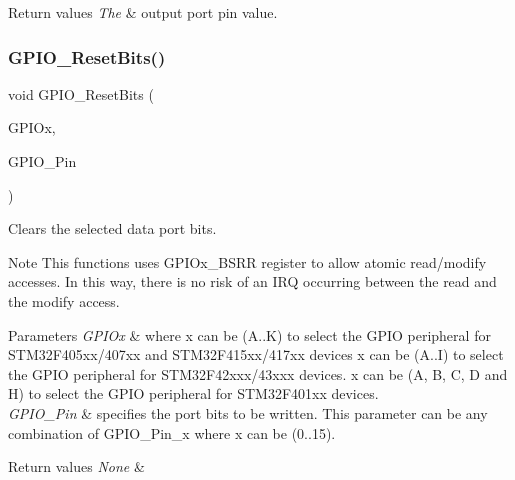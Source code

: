 \begin{DoxyRetVals}{Return values}
{\em The} & output port pin value. \\
\hline
\end{DoxyRetVals}
\mbox{\label{group___g_p_i_o_ga6fcd35b207a66608dd2c9d7de9247dc8}} 
\subsubsection{\texorpdfstring{G\+P\+I\+O\+\_\+\+Reset\+Bits()}{GPIO\_ResetBits()}}
{\footnotesize\ttfamily void G\+P\+I\+O\+\_\+\+Reset\+Bits (\begin{DoxyParamCaption}\item[{G\+P\+I\+O\+\_\+\+Type\+Def $\ast$}]{G\+P\+I\+Ox,  }\item[{uint16\+\_\+t}]{G\+P\+I\+O\+\_\+\+Pin }\end{DoxyParamCaption})}



Clears the selected data port bits. 

\begin{DoxyNote}{Note}
This functions uses G\+P\+I\+Ox\+\_\+\+B\+S\+RR register to allow atomic read/modify accesses. In this way, there is no risk of an I\+RQ occurring between the read and the modify access. 
\end{DoxyNote}

\begin{DoxyParams}{Parameters}
{\em G\+P\+I\+Ox} & where x can be (A..K) to select the G\+P\+IO peripheral for S\+T\+M32\+F405xx/407xx and S\+T\+M32\+F415xx/417xx devices x can be (A..I) to select the G\+P\+IO peripheral for S\+T\+M32\+F42xxx/43xxx devices. x can be (A, B, C, D and H) to select the G\+P\+IO peripheral for S\+T\+M32\+F401xx devices. \\
\hline
{\em G\+P\+I\+O\+\_\+\+Pin} & specifies the port bits to be written. This parameter can be any combination of G\+P\+I\+O\+\_\+\+Pin\+\_\+x where x can be (0..15). \\
\hline
\end{DoxyParams}

\begin{DoxyRetVals}{Return values}
{\em None} & \\
\hline
\end{DoxyRetVals}
\mbox{\label{group___g_p_i_o_ga9e1352eed7c6620e18af2d86f6b6ff8e}} 
